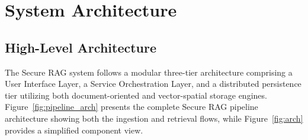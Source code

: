 \chapter{System Architecture}

\section{High-Level Architecture}

The Secure RAG system follows a modular three-tier architecture comprising a User Interface Layer, a Service Orchestration Layer, and a distributed persistence tier utilizing both document-oriented and vector-spatial storage engines. Figure~\ref{fig:pipeline_arch} presents the complete Secure RAG pipeline architecture showing both the ingestion and retrieval flows, while Figure~\ref{fig:arch} provides a simplified component view.

